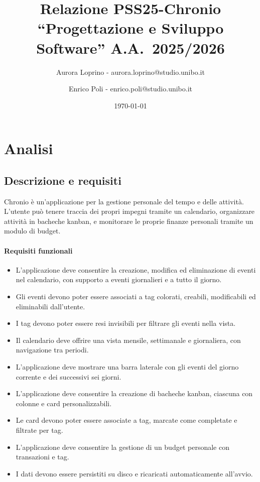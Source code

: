 \documentclass[a4paper,12pt]{report}
\title{Relazione PSS25-Chronio\\``Progettazione e Sviluppo Software'' A.A.\ 2025/2026}
\author{Aurora Loprino - \small aurora.loprino@studio.unibo.it
\and Enrico Poli - \small enrico.poli@studio.unibo.it}
\date{\today}
\begin{document}
\maketitle

\tableofcontents

\chapter{Analisi}
\section{Descrizione e requisiti}

Chronio è un'applicazione per la gestione personale del tempo e delle attività.
L'utente può tenere traccia dei propri impegni tramite un calendario, organizzare attività in bacheche kanban, e monitorare le proprie finanze personali tramite un modulo di budget.

\subsubsection{Requisiti funzionali}
\begin{itemize}
    \item L'applicazione deve consentire la creazione, modifica ed eliminazione di eventi nel calendario, con supporto a eventi giornalieri e a tutto il giorno.
    \item Gli eventi devono poter essere associati a tag colorati, creabili, modificabili ed eliminabili dall'utente.
    \item I tag devono poter essere resi invisibili per filtrare gli eventi nella vista.
    \item Il calendario deve offrire una vista mensile, settimanale e giornaliera, con navigazione tra periodi.
    \item L'applicazione deve mostrare una barra laterale con gli eventi del giorno corrente e dei successivi sei giorni.
    \item L'applicazione deve consentire la creazione di bacheche kanban, ciascuna con colonne e card personalizzabili.
    \item Le card devono poter essere associate a tag, marcate come completate e filtrate per tag.
    \item L'applicazione deve consentire la gestione di un budget personale con transazioni e tag.
    \item I dati devono essere persistiti su disco e ricaricati automaticamente all'avvio.
\end{itemize}
\end{document}
